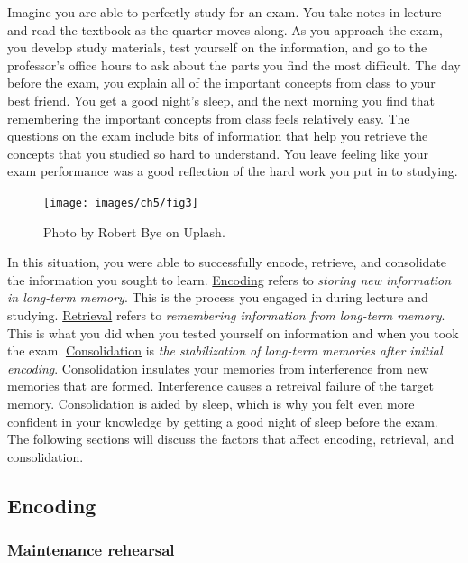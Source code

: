 \documentclass[
]{krantz}
\begin{document}
Imagine you are able to perfectly study for an exam. You take notes in lecture and read the textbook as the quarter moves along. As you approach the exam, you develop study materials, test yourself on the information, and go to the professor's office hours to ask about the parts you find the most difficult. The day before the exam, you explain all of the important concepts from class to your best friend. You get a good night's sleep, and the next morning you find that remembering the important concepts from class feels relatively easy. The questions on the exam include bits of information that help you retrieve the concepts that you studied so hard to understand. You leave feeling like your exam performance was a good reflection of the hard work you put in to studying.

\begin{figure}

{\centering \texttt{[image: images/ch5/fig3]} 

}

\caption{Photo by Robert Bye on Uplash.}\label{fig:library}
\end{figure}

In this situation, you were able to successfully encode, retrieve, and consolidate the information you sought to learn. \hyperref[encoding]{Encoding} refers to \emph{storing new information in long-term memory}. This is the process you engaged in during lecture and studying. \hyperref[retrieval]{Retrieval} refers to \emph{remembering information from long-term memory}. This is what you did when you tested yourself on information and when you took the exam. \hyperref[consolidation]{Consolidation} is \emph{the stabilization of long-term memories after initial encoding}. Consolidation insulates your memories from interference from new memories that are formed. Interference causes a retreival failure of the target memory. Consolidation is aided by sleep, which is why you felt even more confident in your knowledge by getting a good night of sleep before the exam. The following sections will discuss the factors that affect encoding, retrieval, and consolidation.

\subsection*{Encoding}\label{encoding}


\subsubsection*{Maintenance rehearsal}\label{maintenance-rehearsal}
\end{document}
